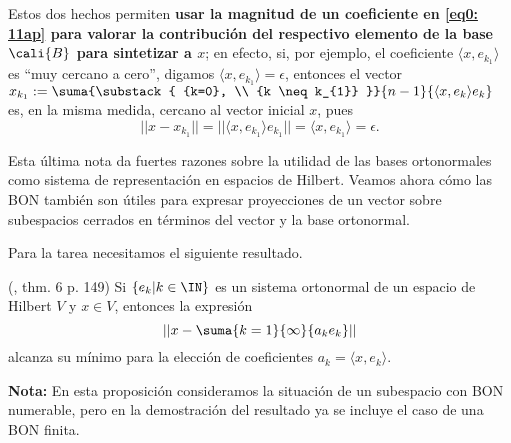 \begin{nota}
Estos dos hechos permiten \textbf{usar la magnitud de un coeficiente en 
\eqref{eq0: 11ap} para valorar la contribución del respectivo 
elemento de la base $\cali{B}$ para sintetizar a $x$};
en efecto, si, por ejemplo, el coeficiente $\langle x, e_{k_{1}} \rangle$
es ``muy cercano a cero'', digamos $\langle x, e_{k_{1}} \rangle = \epsilon$,  
entonces el vector 
$x_{k_{1}}:= \suma{\substack{ {k=0}, \\  {k \neq k_{1}} }}{n-1}{
\langle x , e_{k} \rangle e_{k}}$
es, en la misma medida, cercano al vector inicial $x$, pues
\[
|| x - x_{k_{1}} || = || \langle x , e_{k_{1}} \rangle e_{k_{1}} ||
= \langle x , e_{k_{1}} \rangle = \epsilon.
\]
\end{nota}

Esta última nota da fuertes razones sobre la utilidad
de las bases ortonormales como sistema de representación
en espacios de Hilbert. Veamos ahora cómo
las BON también son útiles para expresar proyecciones
de un vector sobre subespacios cerrados en términos del
vector y la base ortonormal. 

Para la tarea necesitamos el siguiente resultado.


\begin{prop} \label{teo: Kol 6, p.149}
(\cite{kolmogorov}, thm. 6 p. 149)
Si $\{ e_{k} |k \in \IN \}$ es un sistema
ortonormal de un espacio de Hilbert $V$ 
y $x \in V$, entonces la expresión
\[
|| x - \suma{k=1}{\infty}{a_{k}e_{k}}  ||
\]
alcanza su mínimo para la elección de coeficientes
$a_{k}= \langle x , e_{k} \rangle $.
\end{prop}

\noindent
\textbf{Nota:}
En esta proposición consideramos la situación de un subespacio
con BON numerable, pero en la demostración del resultado ya
se incluye el caso de una BON finita.

